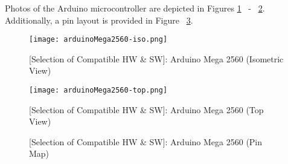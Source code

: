 \documentclass[crop=false,float=true,class=scrreprt]{standalone}
\begin{document}
\clearpage




Photos of the Arduino microcontroller are depicted in Figures
\ref{FIG:preliminaryDecisions:selectionHardwareSoftware:hardware:components:microcontroller:iso}~%
-~%
\ref{FIG:preliminaryDecisions:selectionHardwareSoftware:hardware:components:microcontroller:top}.
Additionally, a pin layout is provided in Figure~%
\ref{FIG:preliminaryDecisions:selectionHardwareSoftware:hardware:components:microcontroller:pin}.




\vspace*{\fill}
\begin{figure}[H]%
\centering%
\texttt{[image: arduinoMega2560-iso.png]}%
\caption[{[Selection of Compatible HW \& SW]: Arduino Mega 2560 (Isometric View)}]%
        {{[Selection of Compatible HW \& SW]: Arduino Mega 2560 (Isometric View)~%
           \cite{REF:online:reichelt:arduinoMega}%
           \label{FIG:preliminaryDecisions:selectionHardwareSoftware:hardware:components:microcontroller:iso}%
        }}%


\end{figure}

\vspace*{\fill}

\begin{figure}[H]%
\centering%
\texttt{[image: arduinoMega2560-top.png]}%
\caption[{[Selection of Compatible HW \& SW]: Arduino Mega 2560 (Top View)}]%
        {{[Selection of Compatible HW \& SW]: Arduino Mega 2560 (Top View)~%
           \cite{REF:online:reichelt:arduinoMega}%
           \label{FIG:preliminaryDecisions:selectionHardwareSoftware:hardware:components:microcontroller:top}%
        }}%
\end{figure}

\vspace*{\fill}




\clearpage




\vspace*{\fill}
\begin{figure}[H]%
\centering%
%
\caption[{[Selection of Compatible HW \& SW]: Arduino Mega 2560 (Pin Map)}]%
        {{[Selection of Compatible HW \& SW]: Arduino Mega 2560 (Pin Map)~%
          \cite {REF:online:pighiXXX:pinout:arduinoMega}%
          \label{FIG:preliminaryDecisions:selectionHardwareSoftware:hardware:components:microcontroller:pin}%
        }}%
\end{figure}
\vspace*{\fill}




\clearpage



\iffalse

\subsubsubsectionA{Digital Outputs and PWM}




\subsubsubsectionA{Serial Controller}

-mention input buffer limits\\
-baud rate limits\\




\clearpage

\fi
\end{document}
